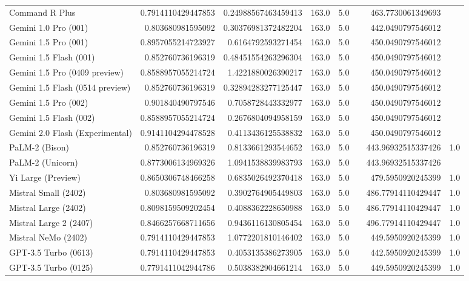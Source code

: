 \begin{table}[htp]
{\begin{tabular}{lrrrrrrr}
Command R Plus & 0.7914110429447853 & 0.24988567463459413 & 163.0 & 5.0 &  & 463.7730061349693 &  \\
Gemini 1.0 Pro (001) & 0.803680981595092 & 0.30376981372482204 & 163.0 & 5.0 &  & 442.0490797546012 &  \\
Gemini 1.5 Pro (001) & 0.8957055214723927 & 0.6164792593271454 & 163.0 & 5.0 &  & 450.0490797546012 &  \\
Gemini 1.5 Flash (001) & 0.852760736196319 & 0.48451554263296304 & 163.0 & 5.0 &  & 450.0490797546012 &  \\
Gemini 1.5 Pro (0409 preview) & 0.8588957055214724 & 1.4221880026390217 & 163.0 & 5.0 &  & 450.0490797546012 &  \\
Gemini 1.5 Flash (0514 preview) & 0.852760736196319 & 0.32894283277125447 & 163.0 & 5.0 &  & 450.0490797546012 &  \\
Gemini 1.5 Pro (002) & 0.901840490797546 & 0.7058728443332977 & 163.0 & 5.0 &  & 450.0490797546012 &  \\
Gemini 1.5 Flash (002) & 0.8588957055214724 & 0.2676804094958159 & 163.0 & 5.0 &  & 450.0490797546012 &  \\
Gemini 2.0 Flash (Experimental) & 0.9141104294478528 & 0.4113436125538832 & 163.0 & 5.0 &  & 450.0490797546012 &  \\
PaLM-2 (Bison) & 0.852760736196319 & 0.8133661293544652 & 163.0 & 5.0 &  & 443.96932515337426 & 1.0 \\
PaLM-2 (Unicorn) & 0.8773006134969326 & 1.0941538839983793 & 163.0 & 5.0 &  & 443.96932515337426 &  \\
Yi Large (Preview) & 0.8650306748466258 & 0.6835026492370418 & 163.0 & 5.0 &  & 479.5950920245399 & 1.0 \\
Mistral Small (2402) & 0.803680981595092 & 0.3902764905449803 & 163.0 & 5.0 &  & 486.77914110429447 & 1.0 \\
Mistral Large (2402) & 0.8098159509202454 & 0.4088362228650988 & 163.0 & 5.0 &  & 486.77914110429447 & 1.0 \\
Mistral Large 2 (2407) & 0.8466257668711656 & 0.9436116130805454 & 163.0 & 5.0 &  & 496.77914110429447 & 1.0 \\
Mistral NeMo (2402) & 0.7914110429447853 & 1.0772201810146402 & 163.0 & 5.0 &  & 449.5950920245399 & 1.0 \\
GPT-3.5 Turbo (0613) & 0.7914110429447853 & 0.4053135386273905 & 163.0 & 5.0 &  & 442.5950920245399 & 1.0 \\
GPT-3.5 Turbo (0125) & 0.7791411042944786 & 0.5038382904661214 & 163.0 & 5.0 &  & 449.5950920245399 & 1.0 \\

\end{tabular}}
\end{table}
